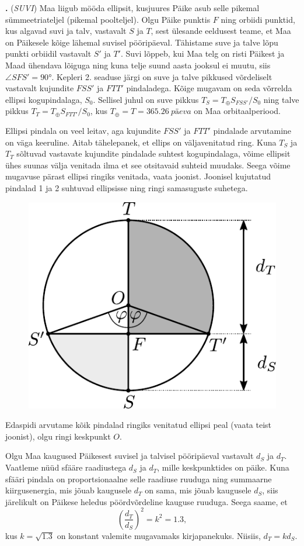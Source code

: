 \documentclass[12pt,a5paper]{article}
\newcommand{\numb}[1]{\vspace{5pt}\textbf{\large #1}}
\newcommand{\nimi}[1]{(\textsl{\small #1})}
\newcounter{ylesanne}
\newcommand{\yl}[1]{\addtocounter{ylesanne}{1}\numb{\theylesanne.} \nimi{#1} \newblock{}}
\begin{document}
\yl{SUVI}
Maa liigub mööda ellipsit, kusjuures Päike asub selle pikemal sümmeetriateljel (pikemal poolteljel). Olgu Päike punktis $F$ ning orbiidi punktid, kus algavad suvi ja talv, vastavalt $S$ ja $T$, sest ülesande eeldusest teame, et Maa on Päikesele kõige lähemal suvisel pööripäeval. Tähistame suve ja talve lõpu punkti orbiidil vastavalt $S'$ ja $T'$. Suvi lõppeb, kui Maa telg on risti Päikest ja Maad ühendava lõiguga ning kuna telje suund aasta jooksul ei muutu, siis $\angle SFS' = \ang{90}$. Kepleri 2. seaduse järgi on suve ja talve pikkused võrdeliselt vastavalt kujundite $FSS'$ ja $FTT'$ pindaladega. Kõige mugavam on seda võrrelda ellipsi kogupindalaga, $S_0$. Sellisel juhul on suve pikkus $T_S = T_\oplus S_{FSS'}/S_0 $ ning talve pikkus $T_T = T_\oplus S_{FTT'}/S_0$, kus $T_\oplus = T =\SI{365.26}{päeva}$ on Maa orbitaalperiood.	

Ellipsi pindala on veel leitav, aga kujundite $FSS'$ ja $FTT'$ pindalade arvutamine on väga keeruline. Aitab tähelepanek, et ellips on väljavenitatud ring. Kuna $T_S$ ja $T_T$ sõltuvad vastavate kujundite pindalade suhtest kogupindalaga, võime ellipsit ühes suunas välja venitada ilma et see otsitavaid suhteid muudaks. Seega võime mugavuse pärast ellipsi ringiks venitada, vaata joonist. Joonisel kujutatud pindalad 1 ja 2 suhtuvad ellipsisse ning ringi samasuguste suhetega.

\begin{figure}[H]
	\centering
	\includegraphics[width=0.4\linewidth]{suvi-joonis-2.pdf}
\end{figure}

Edaspidi arvutame kõik pindalad ringiks venitatud ellipsi peal (vaata teist joonist), olgu ringi keskpunkt $O$.


Olgu Maa kaugused Päikesest suvisel ja talvisel pööripäeval vastavalt $d_S$ ja $d_T$. Vaatleme nüüd sfääre raadiustega $d_S$ ja $d_T$, mille keskpunktides on päike. Kuna sfääri pindala on proportsionaalne selle raadiuse ruuduga ning summaarne kiirgusenergia, mis jõuab kaugusele $d_T$ on sama, mis jõuab kaugusele $d_S$, siis järelikult on Päikese heledus pöördvõrdeline kauguse ruuduga. Seega saame, et
\[
\left(\frac{d_T}{d_S}\right)^2 = k^2 = \num{1.3},
\]
kus $k = \sqrt{\num{1.3}}$ on konstant valemite mugavamaks kirjapanekuks. Niisiis, $d_T = kd_S$.
\end{document}
